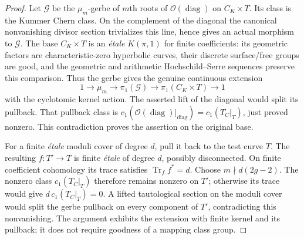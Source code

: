 \documentclass[11pt,oneside]{article}
\begin{document}
\begin{proof}
Let $\mathcal G$ be the $\mu_m$-gerbe of $m$th roots of
$\mathcal O(\operatorname{diag})$ on $C_K\times T$.
Its class is the Kummer Chern class.  On the complement of the
diagonal the canonical nonvanishing divisor section trivializes
this line, hence gives an actual morphism to $\mathcal G$.
The base $C_K\times T$ is an \emph{\'etale} $K(\pi,1)$ for finite
coefficients: its geometric factors are characteristic-zero
hyperbolic curves, their discrete surface/free groups are good, and
the geometric and arithmetic Hochschild--Serre sequences preserve
this comparison.  Thus the gerbe gives the genuine continuous
extension
\[
 1\to\mu_m\to\pi_1(\mathcal G)\to
                \pi_1(C_K\times T)\to1
\]
with the cyclotomic kernel action.  The asserted lift of the diagonal
would split its pullback.  That pullback class is
$c_1(\mathcal O(\operatorname{diag})|_{\operatorname{diag}})
=c_1(T_C|_T)$, just proved nonzero.  This contradiction proves the
assertion on the original base.

For a finite \emph{\'etale} moduli cover of degree $d$, pull it back
to the test curve $T$.  The resulting $f:T'\to T$ is finite
\emph{\'etale} of degree $d$, possibly disconnected.  On finite
coefficient cohomology its trace satisfies
$\operatorname{Tr}_f f^*=d$.  Choose $m\nmid d(2g-2)$.
The nonzero class $c_1(T_C|_T)$ therefore remains nonzero on $T'$;
otherwise its trace would give $d\,c_1(T_C|_T)=0$.
A lifted tautological section on the moduli cover would split the
gerbe pullback on every component of $T'$, contradicting this
nonvanishing.  The argument exhibits the extension with finite
kernel and its pullback; it does not require goodness of a mapping
class group.
\end{proof}
\end{document}
